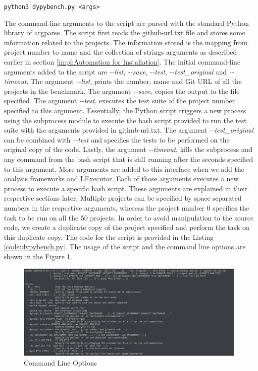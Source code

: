 \verb$python3 dypybench.py <args>$

The command-line arguments to the script are parsed with the standard Python library of argparse.
The script first reads the github-url.txt file and stores some information related to the projects.
The information stored is the mapping from project number to name and the collection of strings arguments as described earlier in section \ref{impl:Automation for Installation}.
The initial command-line arguments added to the script are \textit{\--\--list}, \textit{\--\--save}, \textit{\--\--test}, \textit{\--\--test\_original} and \textit{\--\--timeout}.
The argument \textit{\--\--list}, prints the number, name and Git URL of all the projects in the benchmark.
The argument \textit{\--\--save}, copies the output to the file specified.
The argument \textit{\--\--test}, executes the test suite of the project number specified to this argument.
Essentially, the Python script triggers a new process using the subprocess module to execute the bash script provided to run the test suite with the arguments provided in github-url.txt.
The argument \textit{\--\--test\_original} can be combined with \textit{\--\--test} and specifies the tests to be performed on the original copy of the code.  
Lastly, the argument \textit{\--\--timeout}, kills the subprocess and any command from the bash script that is still running after the seconds specified to this argument.  
More arguments are added to this interface when we add the analysis frameworks and LExecutor.
Each of those arguments executes a new process to execute a specific bash script.
These arguments are explained in their respective sections later.
Multiple projects can be specified by space separated numbers in the respective arguments, whereas the project number 0 specifies the task to be run on all the 50 projects.  
In order to avoid manipulation to the source code, we create a duplicate copy of the project specified and perform the task on this duplicate copy. 
The code for the script is provided in the Listing \ref{code:dypybench.py}.
The usage of the script and the command line options are shown in the Figure \ref{fig:command-line-options}.
\begin{figure}[ht]
    \centering
    \includegraphics[width=1\linewidth]{figures/implementation/command-line-options.png}
    \caption[Command Line Options]{\label{fig:command-line-options}Command Line Options}
\end{figure}

